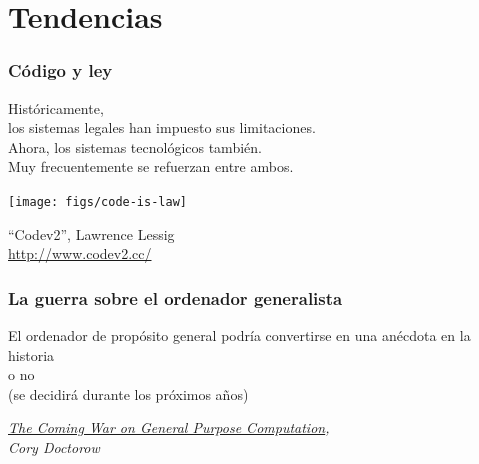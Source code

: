 \documentclass[17pt,aspectratio=169]{beamer}
\begin{document}
\section{Tendencias}


\begin{frame}
\frametitle{Código y ley}

\begin{center}
  Históricamente, \\
  los sistemas legales han impuesto sus limitaciones. \\
  \vspace{1cm}
Ahora, los sistemas tecnológicos también. \\
  \vspace{1cm}
Muy frecuentemente se refuerzan entre ambos. \\
\end{center}

\end{frame}

\begin{frame}[fragile]

  \begin{center}
  \texttt{[image: figs/code-is-law]}
  \end{center}

  \begin{flushright}
``Codev2'', Lawrence Lessig \\
\url{http://www.codev2.cc/}
\end{flushright}

\end{frame}



\begin{frame}
\frametitle{La guerra sobre el ordenador generalista}

\begin{center}
El ordenador de propósito general podría convertirse en una anécdota en la historia \\
o no
\\
(se decidirá durante los próximos años) \\
\end{center}

\begin{flushright}
{\em \href{http://boingboing.net/2011/12/27/the-coming-war-on-general-purp.html}{The Coming War on General Purpose Computation}, \\
  Cory Doctorow} \\
\end{flushright}

\end{frame}
\end{document}
